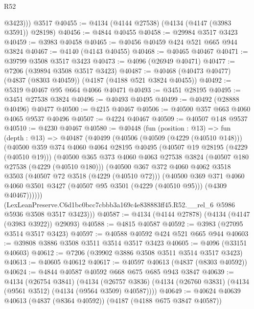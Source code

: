 \begin{lexlean}{R52}
\begin{coremodule}
          @3423)))
    @3517
@40455 := @4134 (@4144 @27538) (@4134 (@4147 (@3983 @3591)) @28198)
@40456 := @4844 @40455
@40458 := @29984 @3517 @3423
@40459 := @3983 @40458
@40465 := @40456 @40459 @424 @521 @665 @944 @3824
@40467 := @4140 (@4143 @40455)
@40468 := @40465 @40467
@40471 := @39799 @3508 @3517 @3423
@40473 := @4096 (@26949 @40471)
@40477 := @7206 (@39894 @3508 @3517 @3423)
@40487 := @40468 (@40473 @40477) (@4837 (@8303 @40459)) (@4187 (@4188 @521 @3824 @40455))
@40492 := @5319 @40467 @95 @664 @4066 @40471
@40493 := @3451 @28195
@40495 := @3451 @27538 @3824
@40496 := @40493 @40495
@40499 := @40492 (@28888 @40496) @40477
@40500 := @4215 @40467
@40506 := @40500 @357 @663 @4060 @4065 @9537 @40496
@40507 := @4224 @40467
@40509 := @40507 @148 @9537
@40510 := @4230 @40467
@40580 := @40448
    (fun (position : @13) =>
    fun (depth : @13) =>
    @40487
      (@40499
        (@40506
          (@40509 (@4229 (@40510 @148)))
          (@40500
            @359
            @374
            @4060
            @4064
            @28195
            @40495
            (@40507 @19 @28195 (@4229 (@40510 @19)))
            (@40500
              @365
              @373
              @4060
              @4063
              @27538
              @3824
              (@40507 @180 @27538 (@4229 (@40510 @180)))
              (@40500
                @367
                @372
                @4060
                @4062
                @3518
                @3503
                (@40507 @72 @3518 (@4229 (@40510 @72)))
                (@40500
                  @369
                  @371
                  @4060
                  @4060
                  @3501
                  @3427
                  (@40507 @95 @3501 (@4229 (@40510 @95)))
                  (@4309 @40467))))))
        (LexLeanPreserve.C6d1bc0bcc7cbbb3a169c4e838883ff45.R52.__rel_6
          @5986
          @5936
          @3508
          @3517
          @3423)))
@40587 := @4134 (@4144 @27878) (@4134 (@4147 (@3983 @3922)) @29093)
@40588 := @4815 @40587
@40592 := @3983 (@27095 @3514 @3517 @3423)
@40597 := @40588 @40592 @424 @521 @665 @944
@40603 := @39808 @3886 @3508 @3511 @3514 @3517 @3423
@40605 := @4096 (@33151 @40603)
@40612 := @7206 (@39902 @3886 @3508 @3511 @3514 @3517 @3423)
@40613 := @40605 @40612
@40617 := @40597 @40613 (@4837 (@8303 @40592))
@40624 := @4844 @40587 @40592 @668 @675 @685 @943 @3847
@40639 := @4134
    (@26754 @3841)
    (@4134 (@26757 @3836) (@4134 (@26760 @3831) (@4134 (@9561 @3512) (@4134 (@9564 @3509) @40587))))
@40649 := @40624 @40639 @40613 (@4837 (@8364 @40592)) (@4187 (@4188 @675 @3847 @40587))

\end{coremodule}
\end{lexlean}
